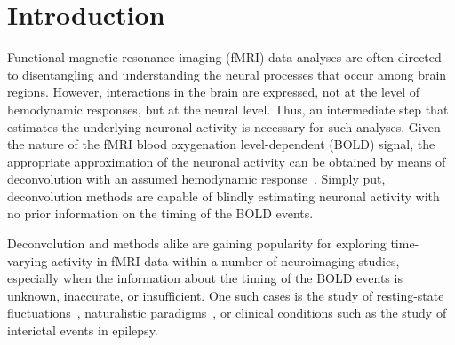 \section{Introduction}








Functional magnetic resonance imaging (fMRI) data analyses are often directed to disentangling and understanding the neural processes that occur among brain regions. However, interactions in the brain are expressed, not at the level of hemodynamic responses, but at the neural level. Thus, an intermediate step that estimates the underlying neuronal activity is necessary for such analyses. Given the nature of the fMRI blood oxygenation level-dependent (BOLD) signal, the appropriate approximation of the neuronal activity can be obtained by means of deconvolution with an assumed hemodynamic response~\cite{gitelman2003ModelingRegionalPsychophysiologic}. Simply put, deconvolution methods are capable of blindly estimating neuronal activity with no prior information on the timing of the BOLD events.

Deconvolution and methods alike are gaining popularity for exploring time-varying activity in fMRI data within a number of neuroimaging studies, especially when the information about the timing of the BOLD events is unknown, inaccurate, or insufficient. One such cases is the study of resting-state fluctuations~\cite{petridou2013periods,karahanouglu2015transient,karahanouglu2017dynamics,kinany2020dynamic,gonzalez2019imaging}, naturalistic paradigms~\cite{betzel2020temporal}, or clinical conditions such as the study of interictal events in epilepsy.

